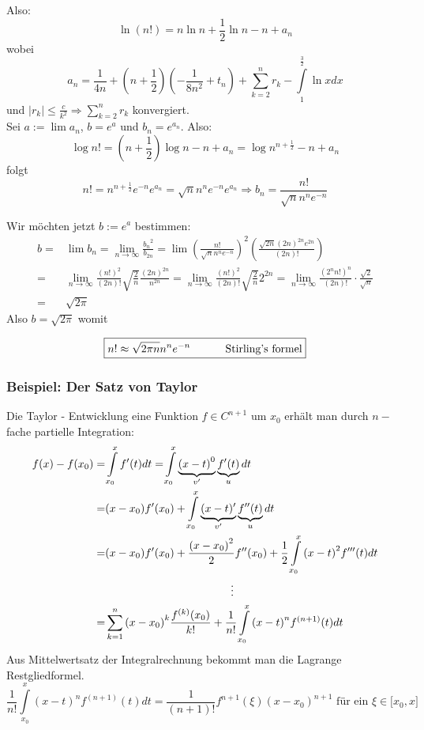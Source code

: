 \noindent Also:
\[\ln (n!) = n\ln n + \frac{1}{2}\ln n - n + {a_n}\]
wobei
\[{a_n} = {\frac{1}{{4n}} + \left( {n + \frac{1}{2}} \right)\left( { - \frac{1}{{8{n^2}}} + {t_n}} \right)} + \sum\limits_{k = 2}^n {{r_k} - \int\limits_1^{\frac{3}{2}} {\ln xdx} } \]
und $\left| {{r_k}} \right| \le \frac{c}{{{k^2}}} \Rightarrow \sum\limits_{k = 2}^n {{r_k}} $ konvergiert.\\

\noindent Sei $a:=\lim a_n$, $b=e^a$ und $b_n=e^{a_n}$. Also:
\[\log n! = \left( {n + \frac{1}{2}} \right)\log n - n + {a_n} = \log {n^{n + \frac{1}{2}}} - n + {a_n}\]
folgt 
\[n! = {n^{n + \frac{1}{2}}}{e^{ - n}}{e^{{a_n}}} = \sqrt n {n^n}{e^{ - n}}{e^{{a_n}}} \Rightarrow {b_n} = \frac{{n!}}{{\sqrt n {n^n}{e^{ - n}}}}\]

\noindent Wir möchten jetzt $b:=e^a$ bestimmen:
\begin{align*}
b =&\lim {b_n} = \mathop {\lim }\limits_{n \to \infty } \frac{{{b_n}^2}}{{{b_{2n}}}} = \lim {\left( {\frac{{n!}}{{\sqrt n {n^n}{e^{ - n}}}}} \right)^2}\left( {\frac{{\sqrt {2n} {{(2n)}^{2n}}{e^{2n}}}}{{(2n)!}}} \right)\\
=&\mathop {\lim }\limits_{n \to \infty } \frac{{{{(n!)}^2}}}{{(2n)!}}\sqrt {\frac{2}{n}} \frac{{{{(2n)}^{2n}}}}{{{n^{2n}}}} = \mathop {\lim }\limits_{n \to \infty } \frac{{{{(n!)}^2}}}{{(2n)!}}\sqrt {\frac{2}{n}} {2^{2n}} = \mathop {\lim }\limits_{n \to \infty } \frac{{{{({2^n}n!)}^n}}}{{(2n)!}} \cdot \frac{{\sqrt 2 }}{{\sqrt n }}\\
=&\sqrt {2\pi} 
\end{align*}
\noindent Also $b=\sqrt{2\pi}$ womit 

\[\boxed{n! \approx \sqrt {2\pi n} {n^n}{e^{ - n}}\text{\hspace{10mm} Stirling's formel}}\]

\subsubsection*{Beispiel: Der Satz von Taylor}
Die Taylor - Entwicklung eine Funktion $f\in C^{n+1}$ um $x_0$ erhält man durch $n-$fache partielle Integration:
\begin{align*}
f(x) - f({x_0}) =&\int\limits_{{x_0}}^x {f'(t)dt = } \int\limits_{{x_0}}^x {\underbrace {{{(x - t)}^0}}_{v'}\underbrace {f'(t)}_udt}\\
 =&(x - {x_0})f'({x_0}) + \int\limits_{{x_0}}^x {\underbrace {(x - t)'}_{v'}} \underbrace {f''(t)}_udt\\
 =&(x - {x_0})f'({x_0}) + \frac{{{{(x - {x_0})}^2}}}{2}f''({x_0}) + \frac{1}{2}\int\limits_{{x_0}}^x {{{(x - t)}^2}f'''(t)dt} \\
&\hspace{40mm}\vdots\\
=&\sum\limits_{k = 1}^n {{{(x - {x_0})}^k}\frac{{{f^{(k)}}({x_0})}}{{k!}}}  + \frac{1}{{n!}}\int\limits_{{x_0}}^x {{{(x - t)}^n}{f^{(n + 1)}}(t)dt} 
\end{align*}
Aus Mittelwertsatz der Integralrechnung bekommt man die Lagrange Restgliedformel.
\[\frac{1}{{n!}}\int\limits_{{x_0}}^x {{{(x - t)}^n}{f^{(n + 1)}}(t)dt}  = \frac{1}{{(n + 1)!}}{f^{n + 1}}(\xi ){(x - {x_0})^{n + 1}}\text{ für ein }\xi\in\lbrack x_0,x\rbrack\]

